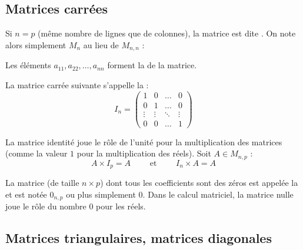 \documentclass[11pt,class=report,crop=false]{standalone}
\begin{document}
\subsection{Matrices carrées}

Si $n=p$ (même nombre de lignes que de colonnes), la matrice est dite 
.
On note alors simplement $M_{n}$ au lieu de $M_{n,n}$ :






Les éléments $a_{11}, a_{22}, \ldots, a_{nn}$ forment la 
de la matrice.


La matrice carrée suivante s'appelle la  :
\[
I_n = \left(
\begin{array}{cccc}
	1 & 0 & \dots & 0\\
	0& 1& \dots & 0\\
	\vdots& \vdots & \ddots  & \vdots\\
	0 & 0 & \dots &1
\end{array}
\right)
\]

La matrice identité joue le rôle de l'unité pour la multiplication des matrices (comme la valeur $1$ pour la multiplication des réels). Soit $A \in M_{n,p}$ :
$$A \times I_p = A \qquad \text{ et } \qquad I_n \times A = A$$

\medskip

La matrice (de taille $n\times p$) dont tous les coefficients sont des zéros
est appelée la  et est notée $0_{n,p}$ ou plus simplement $0$.
Dans le calcul matriciel, la matrice nulle joue le rôle du nombre $0$ pour les réels.


\subsection{Matrices triangulaires, matrices diagonales}
\end{document}
